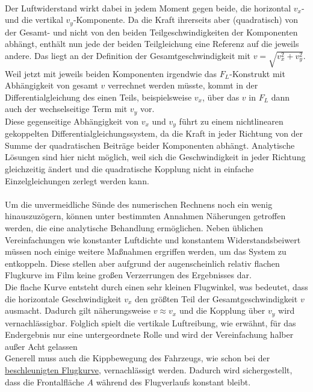 \\
Der Luftwiderstand wirkt dabei in jedem Moment gegen beide, die horizontal $v_x$- und die vertikal $v_y$-Komponente.
Da die Kraft ihrerseits aber (quadratisch) von der Gesamt- und nicht von den beiden Teilgeschwindigkeiten der Komponenten abhängt, enthält nun jede der beiden Teilgleichung eine Referenz auf die jeweils andere. Das liegt an der Definition der Gesamtgeschwindigkeit mit $v = \sqrt{v_x^2 + v_y^2}$. Weil jetzt mit jeweils beiden Komponenten irgendwie das $F_L$-Konstrukt mit Abhängigkeit von gesamt $v$ verrechnet werden müsste, kommt in der Differentialgleichung des einen Teils, beispielsweise $v_x$, über das $v$ in $F_L$ dann auch der wechselseitige Term mit $v_y$ vor.
\\
Diese gegenseitige Abhängigkeit von $v_x$ und $v_y$ führt zu einem nichtlinearen gekoppelten Differentialgleichungssystem, da die Kraft in jeder Richtung von der Summe der quadratischen Beiträge beider Komponenten abhängt. 
Analytische Lösungen sind hier nicht möglich, weil sich die Geschwindigkeit in jeder Richtung gleichzeitig ändert und die quadratische Kopplung nicht in einfache Einzelgleichungen zerlegt werden kann. 
\\
\\
Um die unvermeidliche Sünde des numerischen Rechnens noch ein wenig hinauszuzögern, können unter bestimmten Annahmen Näherungen getroffen werden, die eine analytische Behandlung ermöglichen. Neben üblichen Vereinfachungen wie konstanter Luftdichte und konstantem Widerstandsbeiwert müssen noch einige weitere Maßnahmen ergriffen werden, um das System zu entkoppeln. Diese stellen aber aufgrund der augenscheinlich relativ flachen Flugkurve im Film keine großen Verzerrungen des Ergebnisses dar.
\\
Die flache Kurve entsteht durch einen sehr kleinen Flugwinkel, was bedeutet, dass die horizontale Geschwindigkeit $v_x$ den größten Teil der Gesamtgeschwindigkeit $v$ ausmacht. Dadurch gilt näherungsweise $v \approx v_x$ und die Kopplung über $v_y$ wird vernachlässigbar. Folglich spielt die vertikale Luftreibung, wie erwähnt, für das Endergebnis nur eine untergeordnete Rolle und wird der Vereinfachung halber außer Acht gelassen
\\
Generell muss auch die Kippbewegung des Fahrzeugs, wie schon bei der \hyperref[sec:unbeschleunigt_neigungswinkel]{beschleunigten Flugkurve}, vernachlässigt werden. Dadurch wird sichergestellt, dass die Frontalfläche $A$ während des Flugverlaufs konstant bleibt.
\\
\\

\\



